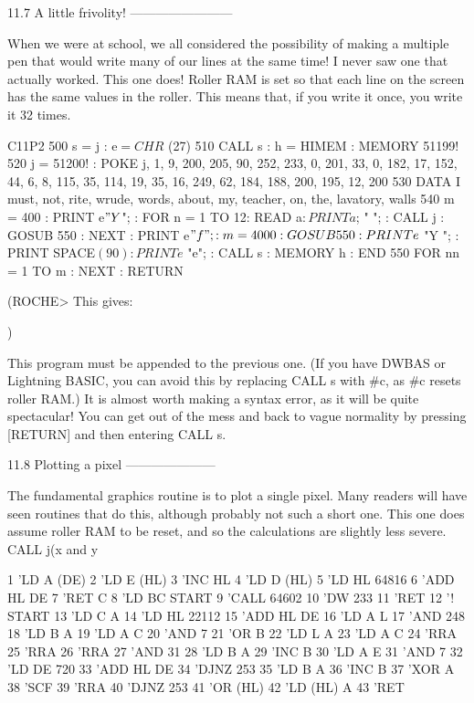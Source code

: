 11.7 A little frivolity!
------------------------

When we were at school, we all considered the possibility of making a multiple 
pen that would write many of our lines at the same time! I never saw one  that 
actually  worked.  This one does! Roller RAM is set so that each line  on  the 
screen  has  the same values in the roller. This means that, if you  write  it 
once, you write it 32 times.

        C11P2
        500 s = j : e$ = CHR$ (27)
        510 CALL s : h = HIMEM : MEMORY 51199!
        520 j = 51200! : POKE j, 1, 9, 200, 205, 90, 252, 233, 0, 201, 33,  0, 
182, 17, 152, 44, 6, 8, 115, 35, 114, 19, 35, 16, 249, 62, 184, 188, 200, 195, 
12, 200
        530 DATA I must, not, rite, wrude, words, about, my, teacher, on, the, 
lavatory, walls
        540  m = 400 : PRINT e$ "Y $"; : FOR n = 1 TO 12: READ a$ : PRINT  a$; 
" ";  :  CALL j : GOSUB 550 : NEXT : PRINT e$ "f"; : m = 4000 :  GOSUB  550  : 
PRINT e$ "Y "; : PRINT SPACE$ (90) : PRINT e$ "e"; : CALL s : MEMORY h : END
        550 FOR nn = 1 TO m : NEXT : RETURN

(ROCHE> This gives:

$$$$
)

This  program  must  be appended to the previous one. (If you  have  DWBAS  or 
Lightning BASIC, you can avoid this by replacing CALL s with #c, as #c  resets 
roller  RAM.)  It is almost worth making a syntax error, as it will  be  quite 
spectacular!  You  can  get out of the mess and back  to  vague  normality  by 
pressing [RETURN] and then entering CALL s.


11.8 Plotting a pixel
---------------------

The fundamental graphics routine is to plot a single pixel. Many readers  will 
have seen routines that do this, although probably not such a short one.  This 
one  does assume roller RAM to be reset, and so the calculations are  slightly 
less  severe. CALL j(x%
and y%

        1 'LD A (DE)
        2 'LD E (HL)
        3 'INC HL
        4 'LD D (HL)
        5 'LD HL 64816
        6 'ADD HL DE
        7 'RET C
        8 'LD BC START
        9 'CALL 64602
        10 'DW 233
        11 'RET
        12 '! START
        13 'LD C A
        14 'LD HL 22112
        15 'ADD HL DE
        16 'LD A L
        17 'AND 248
        18 'LD B A
        19 'LD A C
        20 'AND 7
        21 'OR B
        22 'LD L A
        23 'LD A C
        24 'RRA
        25 'RRA
        26 'RRA
        27 'AND 31
        28 'LD B A
        29 'INC B
        30 'LD A E
        31 'AND 7
        32 'LD DE 720
        33 'ADD HL DE
        34 'DJNZ 253
        35 'LD B A
        36 'INC B
        37 'XOR A
        38 'SCF
        39 'RRA
        40 'DJNZ 253
        41 'OR (HL)
        42 'LD (HL) A
        43 'RET

